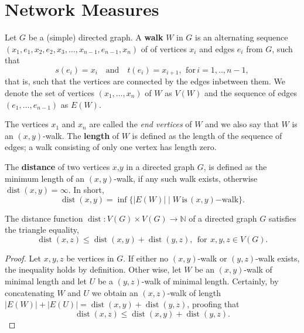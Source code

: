 







\section{Network Measures}\label{sec:network_measures}


Let $G$ be a (simple) directed graph. A \textbf{walk} $W$ in $G$ is an
alternating sequence
$(x_1,e_1,x_2,e_2,x_3,\ldots,x_{n-1},e_{n-1},x_n)$ of of vertices
$x_i$ and edges $e_i$ from $G$, such that
\[
s(e_i) = x_i \quad \mathrm{and} \quad t(e_i) = x_{i+1}, \:\,
\mathrm{for}\, i=1,..,n-1,
\]
that is, such that the vertices are connected by the edges inbetween
them. We denote the set of vertices $(x_1,\ldots,x_n)$ of $W$ as
$V(W)$ and the sequence of edges $(e_1,\dots,e_{n-1})$ as $E(W)$.

The vertices $x_1$ and $x_n$ are called the \textit{end vertices} of
$W$ and we also say that $W$ is an $(x,y)$-walk. The \textbf{length}
of $W$ is defined as the length of the sequence of edges; a walk
consisting of only one vertex has length zero.

\begin{definition}[Distance]
  The \textbf{distance} of two vertices $x$,$y$ in a directed graph
  $G$, is defined as the minimum length of an
  $(x,y)$-walk, if any such walk exists, otherwise
  $\operatorname{dist}(x,y)=\infty$. In short,
  \[
  \operatorname{dist}(x,y) = \inf \{|E(W)| \mid
  W\,\mathrm{is}\,(x,y)\mathrm{-walk}\}.
  \]
\end{definition}

\begin{proposition}
  The distance function $\operatorname{dist}: V(G) \times V(G) \to
  \mathbb{N}$ of a directed graph $G$ satisfies the triangle equality,
  \[
  \operatorname{dist}(x,z) \le \operatorname{dist}(x,y) +
  \operatorname{dist}(y,z), \:\: \mathrm{for}\:\, x,y,z \in V(G).
  \]
\end{proposition}

\begin{proof}
  Let $x,y,z$ be vertices in $G$. If either no $(x,y)$-walk or
  $(y,z)$-walk exists, the inequality holds by definition. Other wise,
  let $W$ be an $(x,y)$-walk of minimal length and let $U$ be a
  $(y,z)$-walk of minimal length. Certainly, by concatenating $W$ and
  $U$ we obtain an $(x,z)$-walk of length $|E(W)| + |E(U)| =
  \operatorname{dist}(x,y) + \operatorname{dist}(y,z)$, proofing
  that \[ \operatorname{dist}(x,z) \le \operatorname{dist}(x,y) +
  \operatorname{dist}(y,z).\]\end{proof}



